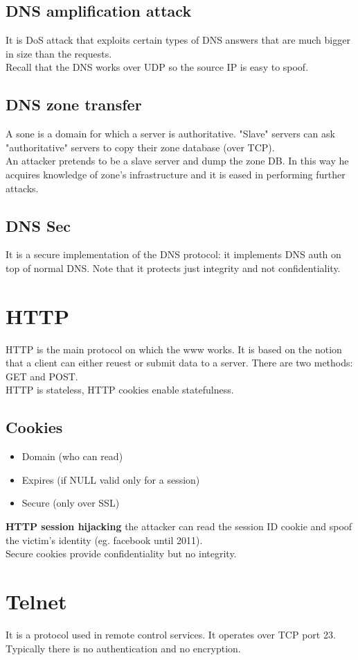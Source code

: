 \documentclass[10pt,a4paper]{book}
\begin{document}
\subsection{DNS amplification attack}
It is DoS attack that exploits certain types of DNS answers that are much bigger in size than the requests.\\
Recall that the DNS works over UDP so the source IP is easy to spoof.
\subsection{DNS zone transfer}
A sone is a domain for which a server is authoritative. "Slave" servers can ask "authoritative" servers to copy their zone database (over TCP).\\
An attacker pretends to be a slave server and dump the zone DB. In this way he acquires knowledge of zone's infrastructure and it is eased in performing further attacks.
\subsection{DNS Sec}
It is a secure implementation of the DNS protocol: it implements DNS auth on top of normal DNS. Note that it protects just integrity and not confidentiality.
\section{HTTP}
HTTP is the main protocol on which the www works. It is based on the notion that a client can either reuest or submit data to a server. There are two methods: GET and POST.\\
HTTP is stateless, HTTP cookies enable statefulness.
\subsection{Cookies}
\begin{itemize}
\item Domain  (who can read)
\item Expires (if NULL valid only for a session)
\item Secure (only over SSL)
\end{itemize}
\textbf{HTTP session hijacking} the attacker can read the session ID cookie and spoof the victim's identity (eg. facebook until 2011).\\
Secure cookies provide confidentiality but no integrity.
\section{Telnet}
It is a protocol used in remote control services. It operates over TCP port 23. Typically there is no authentication and no encryption.
\end{document}
